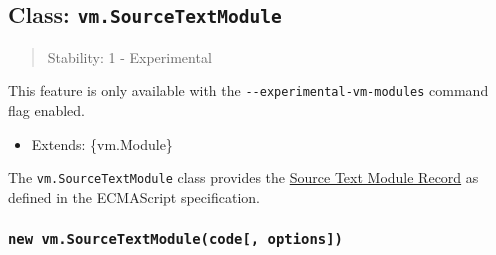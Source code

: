 \subsection{\texorpdfstring{Class:
\texttt{vm.SourceTextModule}}{Class: vm.SourceTextModule}}\label{class-vm.sourcetextmodule}

\begin{quote}
Stability: 1 - Experimental
\end{quote}

This feature is only available with the
\texttt{-\/-experimental-vm-modules} command flag enabled.

\begin{itemize}
\tightlist
\item
  Extends: \{vm.Module\}
\end{itemize}

The \texttt{vm.SourceTextModule} class provides the
\href{https://tc39.es/ecma262/\#sec-source-text-module-records}{Source
Text Module Record} as defined in the ECMAScript specification.

\subsubsection{\texorpdfstring{\texttt{new\ vm.SourceTextModule(code{[},\ options{]})}}{new vm.SourceTextModule(code{[}, options{]})}}\label{new-vm.sourcetextmodulecode-options}

